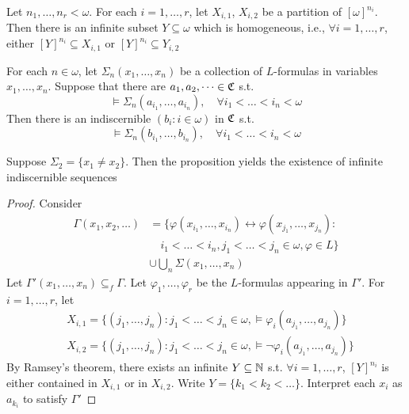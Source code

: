 \documentclass[11pt]{article}
\begin{document}
\begin{theorem}
Let \(n_1,\dots,n_r<\omega\). For each \(i=1,\dots,r\), let \(X_{i,1}\), \(X_{i,2}\) be a partition
of \([\omega]^{n_i}\). Then there is an infinite subset \(Y\subseteq\omega\) which is homogeneous,
i.e., \(\forall i=1,\dots,r\), either \([Y]^{n_i}\subseteq X_{i,1}\) or \([Y]^{n_i}\subseteq Y_{i,2}\)
\end{theorem}

\begin{proposition}[]
For each \(n\in\omega\), let \(\Sigma_n(x_1,\dots,x_n)\) be a collection of \(L\)-formulas in
variables \(x_1,\dots,x_n\). Suppose that there are \(a_1,a_2,\dots\in\mathfrak{C}\) s.t.
\begin{equation*}
\vDash\Sigma_n(a_{i_1},\dots,a_{i_n}),\quad\forall i_1<\dots<i_n<\omega
\end{equation*}
Then there is an indiscernible \((b_i:i\in\omega)\) in \(\mathfrak{C}\) s.t.
\begin{equation*}
\vDash\Sigma_n(b_{i_1},\dots,b_{i_n}),\quad\forall i_1<\dots<i_n<\omega
\end{equation*}
\end{proposition}


\begin{examplle}[]
Suppose \(\Sigma_2=\{x_1\neq x_2\}\). Then the proposition yields the existence of infinite indiscernible sequences
\end{examplle}

\begin{proof}
Consider
\begin{align*}
\Gamma(x_1,x_2,\dots)&=\{\varphi(x_{i_1},\dots,x_{i_n})\leftrightarrow\varphi(x_{j_1},\dots,x_{j_n}):\\
&\quad i_1<\dots<i_n,j_1<\dots<j_n\in\omega,\varphi\in L\}\\
&\cup\bigcup_n\Sigma(x_1,\dots,x_n)
\end{align*}
Let \(\Gamma'(x_1,\dots,x_n)\subseteq_f\Gamma\). Let \(\varphi_1,\dots,\varphi_r\) be the \(L\)-formulas appearing in \(\Gamma'\).
For \(i=1,\dots,r\), let
\begin{align*}
&X_{i,1}=\{(j_1,\dots,j_n):j_1<\dots<j_n\in\omega,\vDash\varphi_i(a_{j_1},\dots,a_{j_n})\}\\
&X_{i,2}=\{(j_1,\dots,j_n):j_1<\dots<j_n\in\omega,\vDash\neg\varphi_i(a_{j_1},\dots,a_{j_n})\}
\end{align*}
By Ramsey's theorem, there exists an infinite \(Y\subseteq\mathbb{N}\) s.t. \(\forall i=1,\dots,r\), \([Y]^{n_i}\) is either
contained in \(X_{i,1}\) or in \(X_{i,2}\). Write \(Y=\{k_1<k_2<\dots\}\). Interpret each \(x_i\)
as \(a_{k_i}\) to satisfy \(\Gamma'\)
\end{proof}
\end{document}
